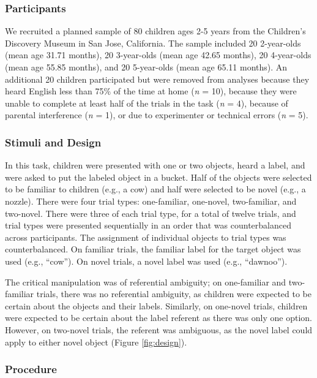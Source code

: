 \documentclass[10pt, letterpaper]{article}
\begin{document}
\subsubsection{Participants}\label{participants}

We recruited a planned sample of 80 children ages 2-5 years from the
Children's Discovery Museum in San Jose, California. The sample included
20 2-year-olds (mean age 31.71 months), 20 3-year-olds (mean age 42.65
months), 20 4-year-olds (mean age 55.85 months), and 20 5-year-olds
(mean age 65.11 months). An additional 20 children participated but were
removed from analyses because they heard English less than 75\% of the
time at home (\emph{n} = 10), because they were unable to complete at
least half of the trials in the task (\emph{n} = 4), because of parental
interference (\emph{n} = 1), or due to experimenter or technical errors
(\emph{n} = 5).

\subsubsection{Stimuli and Design}\label{stimuli-and-design}

In this task, children were presented with one or two objects, heard a
label, and were asked to put the labeled object in a bucket. Half of the
objects were selected to be familiar to children (e.g., a cow) and half
were selected to be novel (e.g., a nozzle). There were four trial types:
one-familiar, one-novel, two-familiar, and two-novel. There were three
of each trial type, for a total of twelve trials, and trial types were
presented sequentially in an order that was counterbalanced across
participants. The assignment of individual objects to trial types was
counterbalanced. On familiar trials, the familiar label for the target
object was used (e.g., ``cow''). On novel trials, a novel label was used
(e.g., ``dawnoo'').

The critical manipulation was of referential ambiguity; on one-familiar
and two-familiar trials, there was no referential ambiguity, as children
were expected to be certain about the objects and their labels.
Similarly, on one-novel trials, children were expected to be certain
about the label referent as there was only one option. However, on
two-novel trials, the referent was ambiguous, as the novel label could
apply to either novel object (Figure \ref{fig:design}).

\subsubsection{Procedure}\label{procedure}
\end{document}
